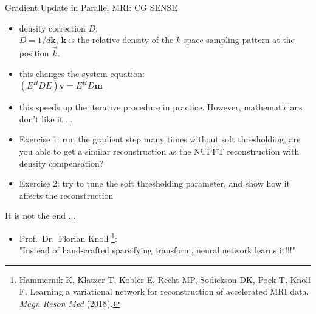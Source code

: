 \begin{frame}{Gradient Update in Parallel MRI: CG SENSE}
	
	\begin{itemize}
		\item density correction $D$:\\
		$D = 1 / d \mathbf{k}$, $\mathbf{k}$ is the relative density of the $k$-space sampling pattern at the position $\vec{k}$.
		\vspace{2em}
		\item this changes the system equation:\\
		$(E^H D E) \mathbf{v} = E^H D \mathbf{m}$
		\vspace{2em}
		\item <2-> this speeds up the iterative procedure in practice. However, mathematicians don't like it ...
		\vspace{1em}
		\item <3-> Exercise 1: run the gradient step many times without soft thresholding, are you able to get a similar reconstruction as the NUFFT reconstruction with density compensation?
		\vspace{1em}
		\item <4-> Exercise 2: try to tune the soft thresholding parameter, and show how it affects the reconstruction
		
	\end{itemize}
	
\end{frame}



\begin{frame}{It is not the end ...}
	\begin{itemize}
		\item Prof.~Dr.~Florian Knoll \footnote{Hammernik K, Klatzer T, Kobler E, Recht MP, Sodickson DK, Pock T, Knoll F. Learning a variational network for reconstruction of accelerated MRI data. \textit{Magn Reson Med} (2018).}:\\
		"Instead of hand-crafted sparsifying transform, neural network learns it!!!"
	\end{itemize}
\end{frame}
